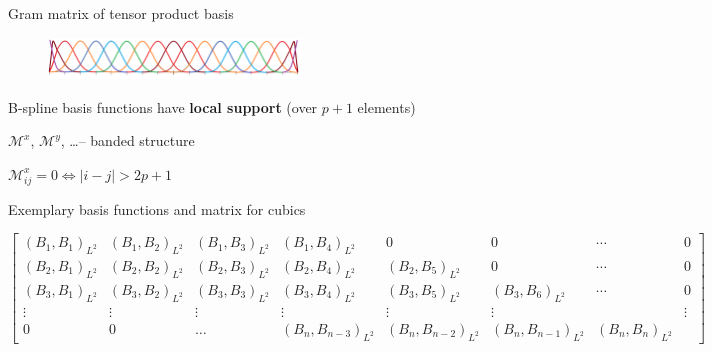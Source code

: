 \documentclass[c]{beamer}
\newcommand{\Prod}[2]{(#1, #2)_{L^2}}
\begin{document}
\begin{frame}{Gram matrix of tensor product basis}

\begin{figure}
  \centering
  \includegraphics[width=0.6\textwidth]{img/Bsplines}
\end{figure}

B-spline basis functions have \textbf{local support} (over $p+1$ elements) 

$\mathcal{M}^x$, $\mathcal{M}^y$, \ldots -- banded structure

$\mathcal{M}^x_{ij} = 0 \iff |i - j| > 2p + 1$

Exemplary basis functions and matrix for cubics

\begin{tiny}
\begin{equation*}
	\begin{bmatrix}
    \Prod{B_1}{B_1} & \Prod{B_1}{B_2} & \Prod{B_1}{B_3} & \Prod{B_1}{B_4} & 0 & 0 & \cdots & 0 \\
    \Prod{B_2}{B_1} & \Prod{B_2}{B_2} & \Prod{B_2}{B_3} & \Prod{B_2}{B_4} & \Prod{B_2}{B_5} & 0 & \cdots & 0 \\
    \Prod{B_3}{B_1} & \Prod{B_3}{B_2} & \Prod{B_3}{B_3} & \Prod{B_3}{B_4} & \Prod{B_3}{B_5} & \Prod{B_3}{B_6} & \cdots & 0 \\
    \vdots & \vdots & \vdots & \vdots &  \vdots & \vdots &  & \vdots\\
    0 & 0 & \ldots & \Prod{B_n}{B_{n-3}}& \Prod{B_n}{B_{n-2}} & \Prod{B_n}{B_{n-1}} & \Prod{B_n}{B_n}
  \end{bmatrix}
\end{equation*}
\end{tiny}

\end{frame}


\end{document}
